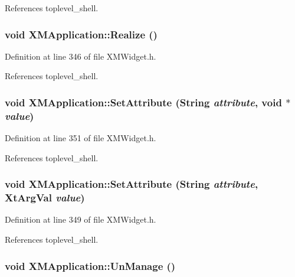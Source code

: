 References toplevel\_\-shell.
\subsubsection{\setlength{\rightskip}{0pt plus 5cm}void XMApplication::Realize ()\hspace{0.3cm}{\tt  [inline]}}\label{classXMApplication_a6}




Definition at line 346 of file XMWidget.h.

References toplevel\_\-shell.
\subsubsection{\setlength{\rightskip}{0pt plus 5cm}void XMApplication::Set\-Attribute (String {\em attribute}, void $\ast$ {\em value})\hspace{0.3cm}{\tt  [inline]}}\label{classXMApplication_a9}




Definition at line 351 of file XMWidget.h.

References toplevel\_\-shell.
\subsubsection{\setlength{\rightskip}{0pt plus 5cm}void XMApplication::Set\-Attribute (String {\em attribute}, Xt\-Arg\-Val {\em value})\hspace{0.3cm}{\tt  [inline]}}\label{classXMApplication_a8}




Definition at line 349 of file XMWidget.h.

References toplevel\_\-shell.
\subsubsection{\setlength{\rightskip}{0pt plus 5cm}void XMApplication::Un\-Manage ()\hspace{0.3cm}{\tt  [inline]}}\label{classXMApplication_a5}




